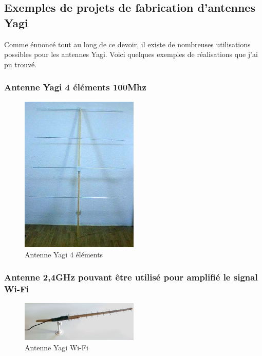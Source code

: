 \documentclass[12pt, a4paper]{article}
\begin{document}
\newpage
\subsection{Exemples de projets de fabrication d'antennes Yagi}
Comme énnoncé tout au long de ce devoir, il existe
de nombreuses utilisations possibles pour les antennes 
Yagi. Voici quelques exemples de réalisations que 
j'ai pu trouvé. 
\subsubsection*{Antenne Yagi 4 éléments 100Mhz}
\begin{figure}[h]
    \centering
    \includegraphics[width=0.5\textwidth]{img/antenne-4.jpg}
    \caption{Antenne Yagi 4 éléments \cite{r6}}
    \label{fig:antenn}
\end{figure}

\subsubsection*{Antenne 2,4GHz pouvant être utilisé pour amplifié le signal Wi-Fi}
\begin{figure}[h]
    \centering
    \includegraphics[width=0.5\textwidth]{img/ant-wifi.jpg}
    \caption{Antenne Yagi Wi-Fi \cite{r7}}
    \label{fig:wifi}
\end{figure}
\end{document}
